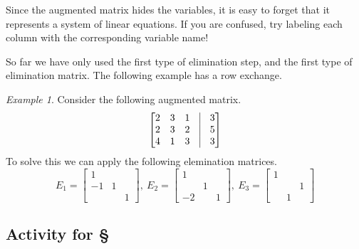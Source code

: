 \documentclass[11pt,oneside]{amsbook}
\theoremstyle{definition}
\theoremstyle{plain}
\theoremstyle{definition}
\theoremstyle{remark}
\newtheorem{example}[theorem]{Example}
\numberwithin{equation}{section}
\numberwithin{figure}{section}
\begin{document}
Since the augmented matrix hides the variables, it is easy to forget that it represents a system of linear equations. If you are confused, try labeling each column with the corresponding variable name!

So far we have only used the first type of elimination step, and the first type of elimination matrix. The following example has a row exchange.

\begin{example}
  Consider the following augmented matrix.
  \[\begin{bmatrix}2&3&1&\vline&3\\2&3&2&\vline&5\\4&1&3&\vline&3
    \end{bmatrix}
  \]
  To solve this we can apply the following elemination matrices.
  \[E_1=\begin{bmatrix}1\\-1&1\\&&1\end{bmatrix},\ 
    E_2=\begin{bmatrix}1\\&1\\-2&&1\end{bmatrix},\ 
    E_3=\begin{bmatrix}1\\&&1\\&1\end{bmatrix}
  \]
\end{example}


\newpage
\subsection*{Activity for \S \thesection}
\end{document}
